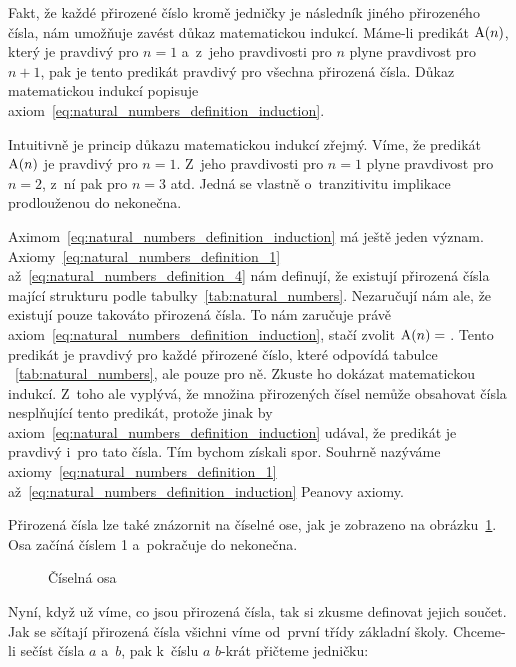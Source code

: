Fakt, že každé přirozené číslo kromě jedničky je následník jiného přirozeného čísla, nám umožňuje zavést důkaz matematickou indukcí. Máme-li predikát \(\mathrm{A}(n)\), který je pravdivý pro \(n=1\) a~z~jeho pravdivosti pro \(n\) plyne  pravdivost pro \(n + 1\), pak je tento predikát pravdivý pro všechna přirozená čísla. Důkaz matematickou
indukcí popisuje axiom~\eqref{eq:natural_numbers_definition_induction}.

Intuitivně je princip důkazu matematickou indukcí zřejmý. Víme, že predikát \(\mathrm{A}(n)\) je pravdivý pro \(n=1\). Z~jeho pravdivosti pro \(n=1\) plyne pravdivost pro \(n=2\), z~ní pak pro \(n=3\) atd. Jedná se vlastně o~tranzitivitu implikace prodlouženou do nekonečna.

Aximom~\eqref{eq:natural_numbers_definition_induction} má ještě jeden význam. Axiomy~\eqref{eq:natural_numbers_definition_1} až~\eqref{eq:natural_numbers_definition_4} nám definují, že existují přirozená čísla mající strukturu podle tabulky~\ref{tab:natural_numbers}. Nezaručují nám ale, že existují pouze takováto přirozená čísla. To nám zaručuje právě axiom~\eqref{eq:natural_numbers_definition_induction}, stačí zvolit \(\mathrm{A}(n) = \) . Tento predikát je pravdivý pro každé přirozené číslo, které odpovídá tabulce ~\ref{tab:natural_numbers}, ale pouze pro ně. Zkuste ho dokázat matematickou indukcí. Z~toho ale vyplývá, že množina přirozených čísel nemůže obsahovat čísla nesplňující tento predikát, protože jinak by axiom~\eqref{eq:natural_numbers_definition_induction} udával, že predikát je pravdivý i~pro tato čísla. Tím bychom získali spor. Souhrně nazýváme axiomy~\eqref{eq:natural_numbers_definition_1} až~\eqref{eq:natural_numbers_definition_induction} Peanovy axiomy.

Přirozená čísla lze také znázornit na číselné ose, jak je zobrazeno na obrázku~\ref{img:ciselna_osa}. Osa začíná číslem 1 a~pokračuje do nekonečna.

\begin{figure}[!h]
\centering
{}
\caption{Číselná osa}
\label{img:ciselna_osa}
\end{figure}

Nyní, když už víme, co jsou přirozená čísla, tak si zkusme definovat jejich součet. Jak se sčítají přirozená čísla všichni víme od~první třídy základní školy. Chceme-li sečíst čísla \(a\) a~\(b\), pak k~číslu \(a\) \(b\)-krát přičteme jedničku:

